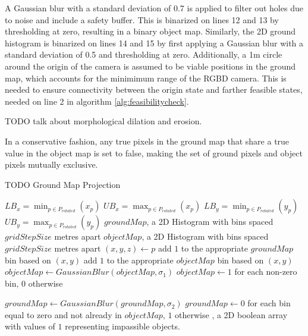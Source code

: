 A Gaussian blur with
a standard deviation of 0.7 is applied to filter out holes due to noise and
include a safety buffer. This is binarized on lines 12 and 13 by thresholding at
zero, resulting in a binary object map.
Similarly, the 2D ground histogram is binarized on lines 14 and 15 by first applying a Gaussian
blur with a standard deviation of 0.5 and thresholding at zero. 
Additionally, a 1m circle around the origin of the camera is assumed to be
viable positions in the ground map, which accounts for the minimimum range of
the RGBD camera. This is needed to ensure connectivity between the origin state
and farther feasible states, needed on line 2 in algorithm
\autoref{alg:feasibilitycheck}.

TODO talk about morphological dilation and erosion.

In a conservative fashion, any true pixels in the ground map that share a true
value in the object map is set to false, making the set of ground pixels and
object pixels mutually exclusive. 

\begin{algorithm}
\caption{TODO Ground Map Projection}
\label{alg:groundmapprojection}
\begin{algorithmic}[1]
\Statex
{}
    \State $LB_x = \min_{p \in P_{rotated}}(x_p)$
    \State $UB_x = \max_{p \in P_{rotated}}(x_p)$
    \State $LB_y = \min_{p \in P_{rotated}}(y_p)$
    \State $UB_y = \max_{p \in P_{rotated}}(y_p)$
    \State $groundMap$, a 2D Histogram with bins spaced $gridStepSize$ metres apart
    \State $objectMap$, a 2D Histogram with bins spaced $gridStepSize$ metres apart
        \State $(x,y,z) \gets p$
            \State add $1$ to the appropriate $groundMap$ bin based on $(x,y)$
        \Else
            \State add $1$ to the appropriate $objectMap$ bin based on $(x,y)$
        \EndIf
    \EndFor
    \State $objectMap \gets GaussianBlur(objectMap, \sigma_1)$
    \State $objectMap \gets 1$ for each non-zero bin, $0$ otherwise

    \State $groundMap \gets GaussianBlur(groundMap, \sigma_2)$
    \State $groundMap \gets 0$ for each bin equal to zero and not already in $objectMap$, $1$ otherwise
\EndFunction
\Statex
{}, a 2D boolean array with values of $1$ representing
impassible objects.
\end{algorithmic}
\end{algorithm}


